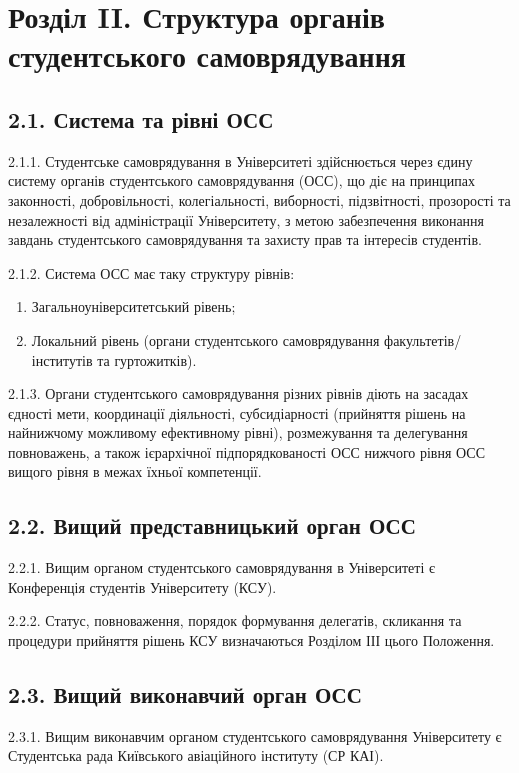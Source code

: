 \section*{Розділ II. Структура органів студентського самоврядування}

\subsection*{2.1. Система та рівні ОСС}
    2.1.1. Студентське самоврядування в Університеті здійснюється через єдину систему органів студентського самоврядування (ОСС), що діє на принципах законності, добровільності, колегіальності, виборності, підзвітності, прозорості та незалежності від адміністрації Університету, з метою забезпечення виконання завдань студентського самоврядування та захисту прав та інтересів студентів.

    2.1.2. Система ОСС має таку структуру рівнів:
    
        \begin{enumerate}[label=\alph*)]
            \item Загальноуніверситетський рівень;
            \item Локальний рівень (органи студентського самоврядування факультетів/інститутів та гуртожитків).
        \end{enumerate}

    2.1.3. Органи студентського самоврядування різних рівнів діють на засадах єдності мети, координації діяльності, субсидіарності (прийняття рішень на найнижчому можливому ефективному рівні), розмежування та делегування повноважень, а також ієрархічної підпорядкованості ОСС нижчого рівня ОСС вищого рівня в межах їхньої компетенції.

\subsection*{2.2. Вищий представницький орган ОСС}
    2.2.1. Вищим органом студентського самоврядування в Університеті є Конференція студентів Університету (КСУ).

    2.2.2. Статус, повноваження, порядок формування делегатів, скликання та процедури прийняття рішень КСУ визначаються Розділом ІІІ цього Положення.

\subsection*{2.3. Вищий виконавчий орган ОСС}
    2.3.1. Вищим виконавчим органом студентського самоврядування Університету є Студентська рада Київського авіаційного інституту (СР КАІ).

